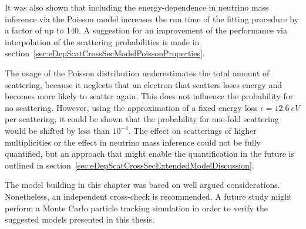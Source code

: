 It was also shown that including the energy-dependence in neutrino mass inference via the Poisson model increases the run time of the fitting procedure by a factor of up to 140. A suggestion for an improvement of the performance via interpolation of the scattering probabilities is made in section~\ref{sec:eDepScatCrossSecModelPoissonProperties}.

The usage of the Poisson distribution underestimates the total amount of scattering, because it neglects that an electron that scatters loses energy and becomes more likely to scatter again. This does not influence the probability for no scattering. However, using the approximation of a fixed energy loss $\epsilon=\SI{12.6}{eV}$ per scattering, it could be shown that the probability for one-fold scattering would be shifted by less than $10^{-4}$. The effect on scatterings of higher multiplicities or the effect in neutrino mass inference could not be fully quantified, but an approach that might enable the quantification in the future is outlined in section~\ref{sec:eDepScatCrossSecExtendedModelDiscussion}.

The model building in this chapter was based on well argued considerations. Nonetheless, an independent cross-check is recommended. A future study might perform a Monte Carlo particle tracking simulation in order to verify the suggested models presented in this thesis.
